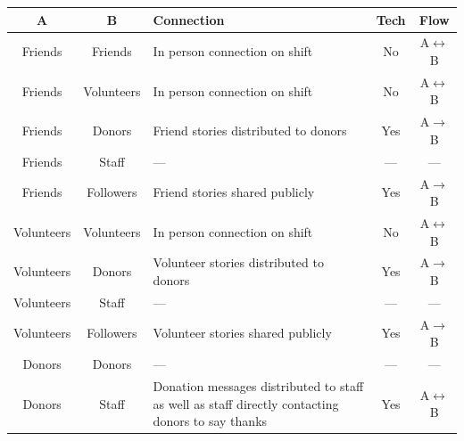 \begin{table}[h]
    \centering
    \begin{tabularx}{\textwidth}{ c | c | Y | c | c }
        \hline
        A          & B          & Connection                                                                                       & Tech & Flow                    \\ [0.5ex]
        \hline
        Friends    & Friends    & In person connection on shift                                                                    & No   & A$\longleftrightarrow$B \\
        Friends    & Volunteers & In person connection on shift                                                                    & No   & A$\longleftrightarrow$B \\
        Friends    & Donors     & Friend stories distributed to donors                                                             & Yes  & A$\longrightarrow$B     \\
        Friends    & Staff      & ---                                                                                              & ---  & ---                     \\
        Friends    & Followers  & Friend stories shared publicly                                                                   & Yes  & A$\longrightarrow$B     \\
        Volunteers & Volunteers & In person connection on shift                                                                    & No   & A$\longleftrightarrow$B \\
        Volunteers & Donors     & Volunteer stories distributed to donors                                                          & Yes  & A$\longrightarrow$B     \\
        Volunteers & Staff      & ---                                                                                              & ---  & ---                     \\
        Volunteers & Followers  & Volunteer stories shared publicly                                                                & Yes  & A$\longrightarrow$B     \\
        Donors     & Donors     & ---                                                                                              & ---  & ---                     \\
        Donors     & Staff      & Donation messages distributed to staff as well as staff directly contacting donors to say thanks & Yes  & A$\longleftrightarrow$B \\

\end{tabularx}
\end{table}
